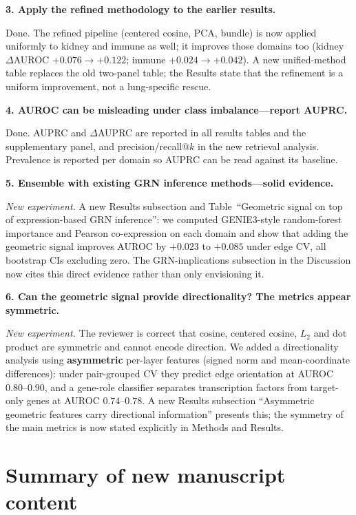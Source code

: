 \documentclass[11pt]{article}
\newcommand{\rc}[1]{\medskip\noindent\textbf{#1}\par}
\begin{document}
\rc{3. Apply the refined methodology to the earlier results.}
Done. The refined pipeline (centered cosine, PCA, bundle) is now applied
uniformly to kidney and immune as well; it improves those domains too (kidney
$\Delta$AUROC $+0.076\to+0.122$; immune $+0.024\to+0.042$). A new unified-method
table replaces the old two-panel table; the Results state that the refinement is
a uniform improvement, not a lung-specific rescue.

\rc{4. AUROC can be misleading under class imbalance---report AUPRC.}
Done. AUPRC and $\Delta$AUPRC are reported in all results tables and the
supplementary panel, and precision/recall@$k$ in the new retrieval analysis.
Prevalence is reported per domain so AUPRC can be read against its
baseline.

\rc{5. Ensemble with existing GRN inference methods---solid evidence.}
\textit{New experiment.} A new Results subsection and
Table~``Geometric signal on top of expression-based GRN inference'': we computed
GENIE3-style random-forest importance and Pearson co-expression on each domain
and show that adding the geometric signal improves AUROC by $+0.023$ to $+0.085$
under edge CV, all bootstrap CIs excluding zero. The GRN-implications subsection
in the Discussion now cites this direct evidence rather than only envisioning it.

\rc{6. Can the geometric signal provide directionality? The metrics appear
symmetric.}
\textit{New experiment.} The reviewer is correct that cosine,
centered cosine, $L_2$ and dot product are symmetric and cannot encode direction.
We added a directionality analysis using \textbf{asymmetric} per-layer features
(signed norm and mean-coordinate differences): under pair-grouped CV they predict
edge orientation at AUROC $0.80$--$0.90$, and a gene-role classifier separates
transcription factors from target-only genes at AUROC $0.74$--$0.78$. A new
Results subsection ``Asymmetric geometric features carry directional
information'' presents this; the symmetry of the main metrics is now stated
explicitly in Methods and Results.

\section{Summary of new manuscript content}
\end{document}
